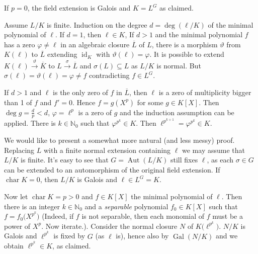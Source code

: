 \documentclass[DIV=14,parskip=full,pointednumbers]{scrartcl}
\renewcommand{\phi}{\varphi}
\theoremstyle{cthm}
\theoremstyle{cvarthm}
\renewenvironment{proof}[1][\proofname]
{\pushQED{\qed}\topsep0pt \partopsep0pt\trivlist\item[\hskip\labelsep\itshape #1.] }{\popQED\endtrivlist\addvspace{6pt plus 6pt}}
\theoremstyle{cdef}
\newcommand{\IN}{\mathbb{N}}
\newcommand{\Aut}{\operatorname{Aut}}
\newcommand{\Gal}{\operatorname{Gal}}
\newcommand{\id}{\operatorname{id}}
\newcommand{\cha}{\operatorname{char}}
\newcommand{\longto}{\longrightarrow}
\newcommand{\ov}{\overline}
\newcommand{\morphism}[1][]{\overset{#1}{\longto}}
\renewcommand{\phi}{\varphi}
\begin{document}
	\begin{proof}[First proof]
		If $p=0$, the field extension is Galois and $K=L^G$ as claimed. 
		
		Assume $L/K$ is finite. Induction on the degree $d=\deg(\ell/K)$ of the minimal polynomial of $\ell$. If $d=1$, then $\ell\in K$, If $d>1$ and the minimal polynomial $f$ has a zero $\phi\neq \ell$ in an algebraic closure $\ov L$ of $L$, there is a morphism $\vartheta$ from $K(\ell)$ to $\ov L$ extending $\id_K$ with $\vartheta(\ell) =\phi$. It is possible to extend $K(\ell)\morphism[\vartheta] \ov K$ to $L\morphism[\sigma] \ov L$ and $\sigma(L) \subseteq L$ as $L/K$ is normal. But $\sigma(\ell) = \vartheta(\ell) = \phi\neq f$ contradicting $f\in L^G$.
		
		If $d>1$ and $\ell$ is the only zero of $f$ in $\ov L$, then $\ell$ is a zero of multiplicity bigger than 1 of $f$ and $f'=0$. Hence $f=g(X^p)$ for some $g\in K[X]$. Then $\deg g = \frac{d}{p}<d$, $\phi =\ell^p$ is a zero of $g$ and the induction assumption can be applied. There is $k\in\IN_0$ such that $\phi^{p^k}\in K$. Then $\ell^{p^{k+1}} = \phi^{p^k} \in K$.
	\end{proof}
	\begin{proof}[Second proof]
		We would like to present a somewhat more natural (and less messy) proof. Replacing $L$ with a finite normal extension containing $\ell$ we may assume that $L/K$ is finite. It's easy to see that $G=\Aut(L/K)$ still fixes $\ell$, as each $\sigma\in G$ can be extended to an automorphism of the original field extension. If $\cha K=0$, then $L/K$ is Galois and $\ell\in L^G=K$.
		
		Now let $\cha K=p>0$ and $f\in K[X]$ the minimal polynomial of $\ell$. Then there is an integer $k\in\IN_0$ and a \emph{separable} polynomial $f_0\in K[X]$ such that $f=f_0\big(X^{p^k}\big)$ (Indeed, if $f$ is not separable, then each monomial of $f$ must be a power of $X^p$. Now iterate.). Consider the normal closure $N$ of $K\big(\ell^{p^k}\big)$. $N/K$ is Galois and $\ell^{p^k}$ is fixed by $G$ (as $\ell$ is), hence also by $\Gal(N/K)$ and we obtain $\ell^{p^k}\in K$, as claimed.
	\end{proof}
\end{document}
